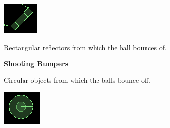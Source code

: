 \documentclass{article}
\begin{document}
    \begin{minipage}[t]{0.25\textwidth}
        \vspace{0pt}
        \centering
        \includegraphics[width=0.9\linewidth,natwidth=610,natheight=642]{bumpers.png} 
        \label{fig:bumpers}
    \end{minipage}
    \begin{minipage}[t]{0.6\textwidth}
        \vspace{0pt}
        Rectangular reflectors from which the ball bounces of.
    \end{minipage}

    \textbf{Shooting Bumpers}

    \begin{minipage}[t]{0.6\textwidth}
        \vspace{0pt}
        Circular objects from which the balls bounce off.
    \end{minipage}
    \begin{minipage}[t]{0.25\textwidth}
        \vspace{0pt}
        \centering
        \includegraphics[width=0.9\linewidth,natwidth=610,natheight=642]{shootingbumpers.png} 
        \label{fig:shootingbumpers}
    \end{minipage}
\end{document}

